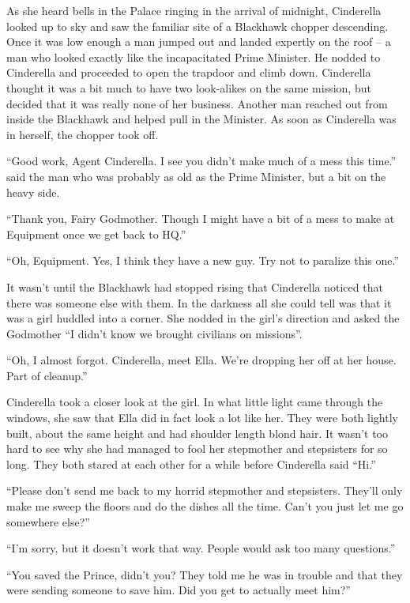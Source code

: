 \documentclass[12pt,letterpaper]{article}
\begin{document}
As she heard bells in the Palace ringing in the arrival of midnight, Cinderella looked up to sky and saw the familiar site of a Blackhawk chopper descending. Once it was low enough a man jumped out and landed expertly on the roof -- a man who looked exactly like the incapacitated Prime Minister. He nodded to Cinderella and proceeded to open the trapdoor and climb down. Cinderella thought it was a bit much to have two look-alikes on the same mission, but decided that it was really none of her business. Another man reached out from inside the Blackhawk and helped pull in the Minister. As soon as Cinderella was in herself, the chopper took off.

``Good work, Agent Cinderella. I see you didn't make much of a mess this time.'' said the man who was probably as old as the Prime Minister, but a bit on the heavy side.

``Thank you, Fairy Godmother. Though I might have a bit of a mess to make at Equipment once we get back to HQ.''

``Oh, Equipment. Yes, I think they have a new guy. Try not to paralize this one.''

It wasn't until the Blackhawk had stopped rising that Cinderella noticed that there was someone else with them. In the darkness all she could tell was that it was a girl huddled into a corner. She nodded in the girl's direction and asked the Godmother ``I didn't know we brought civilians on missions''.

``Oh, I almost forgot. Cinderella, meet Ella. We're dropping her off at her house. Part of cleanup.''

Cinderella took a closer look at the girl. In what little light came through the windows, she saw that Ella did in fact look a lot like her. They were both lightly built, about the same height and had shoulder length blond hair. It wasn't too hard to see why she had managed to fool her stepmother and stepsisters for so long. They both stared at each other for a while before Cinderella said ``Hi.''

``Please don't send me back to my horrid stepmother and stepsisters. They'll only make me sweep the floors and do the dishes all the time. Can't you just let me go somewhere else?''

``I'm sorry, but it doesn't work that way. People would ask too many questions.''

``You saved the Prince, didn't you? They told me he was in trouble and that they were sending someone to save him. Did you get to actually meet him?''
\end{document}
